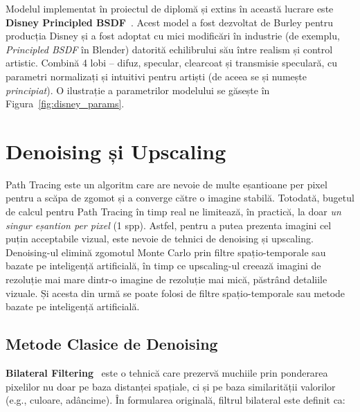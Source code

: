\documentclass[12pt,a4paper]{report}
\numberwithin{equation}{section} %
\begin{document}
Modelul implementat în proiectul de diplomă și extins în această lucrare este \textbf{Disney Principled BSDF}~\cite{Disney,DisneyBSDF}.
Acest model a fost dezvoltat de Burley pentru producția Disney și a fost adoptat cu mici modificări în industrie (de exemplu, \textit{Principled BSDF} în Blender) datorită echilibrului său între realism și control artistic.
Combină 4 lobi -- difuz, specular, clearcoat și transmisie speculară, cu parametri normalizați și intuitivi pentru artiști (de aceea se și numește \textit{principiat}).
O ilustrație a parametrilor modelului se găsește în Figura~\ref{fig:disney_params}.

\section{Denoising și Upscaling}

Path Tracing este un algoritm care are nevoie de multe eșantioane per pixel pentru a scăpa de zgomot și a converge către o imagine stabilă.
Totodată, bugetul de calcul pentru Path Tracing în timp real ne limitează, în practică, la doar \textit{un singur eșantion per pixel} (1 spp).
Astfel, pentru a putea prezenta imagini cel puțin acceptabile vizual, este nevoie de tehnici de denoising și upscaling.
Denoising-ul elimină zgomotul Monte Carlo prin filtre spațio-temporale sau bazate pe inteligență artificială, în timp ce upscaling-ul creează imagini de rezoluție mai mare dintr-o imagine de rezoluție mai mică, păstrând detaliile vizuale.
Și acesta din urmă se poate folosi de filtre spațio-temporale sau metode bazate pe inteligență artificială.

\subsection{Metode Clasice de Denoising}

\textbf{Bilateral Filtering}~\cite{tomasi1998bilateral} este o tehnică care prezervă muchiile prin ponderarea pixelilor nu doar pe baza distanței spațiale, ci și pe baza similarității valorilor (e.g., culoare, adâncime).
În formularea originală, filtrul bilateral este definit ca:
\end{document}
